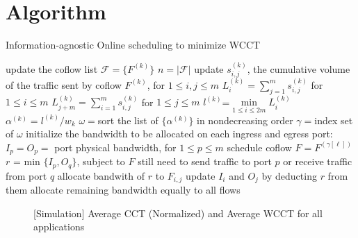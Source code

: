 \documentclass[10pt, conference, letterpaper]{IEEEtran}
\begin{document}
\section{Algorithm}
 \begin{algorithm} 
 \caption{Information-agnostic Online scheduling to minimize WCCT}
 \begin{algorithmic}[1]\label{online-algorithm}
  \STATE update the coflow list $\mathcal{F}=\{F^{(k)}\}$
  \STATE $n=|\mathcal{F}|$
    \STATE update $s_{i,j}^{(k)}$, the cumulative volume of the traffic sent by coflow $F^{(k)}$, for $1 \le i, j \le m$
    \STATE $L_i^{(k)}= \sum_{j=1}^ms_{i,j}^{(k)}$ for $1 \le i \le m$
    \STATE $L_{j+m}^{(k)}= \sum_{i=1}^ms_{i,j}^{(k)}$ for $1 \le j \le m$
    \STATE $l^{(k)}$=$ \min \limits_{1 \le i \le 2m}L_i^{(k)}$
    \STATE $\alpha^{(k)}=l^{(k)}/w_k$
  \ENDFOR
  \STATE $\omega=$sort the list of $\{\alpha^{(k)}\}$ in nondecreasing order
  \STATE $\gamma=$index set of $\omega$
  \ENDIF
  \STATE initialize the bandwidth to be allocated on each ingress and egress port: $I_p=O_p=$ port physical bandwidth, for $1 \le p \le m$
    \STATE schedule coflow $F=F^{(\gamma[\ell])}$
    \STATE $r$ = min $\{I_p, O_q\}$, subject to $F$ still need to send traffic to port $p$ or receive traffic from port $q$
      \STATE allocate bandwith of $r$ to $F_{i,j}$
      \STATE update $I_i$ and $O_j$ by deducting $r$ from them 
    \ENDFOR
  \ENDFOR
  \STATE allocate remaining bandwidth equally to all flows
 \end{algorithmic} 
 \end{algorithm}
 
 \begin{figure}[!t]
\centering
{}
\vspace{-0.1 in}
\caption{[Simulation] Average CCT (Normalized)  and Average WCCT for all applications}
\label{evaluation_motivation_fig}
\vspace{-0.1 in}
\end{figure}
\end{document}
